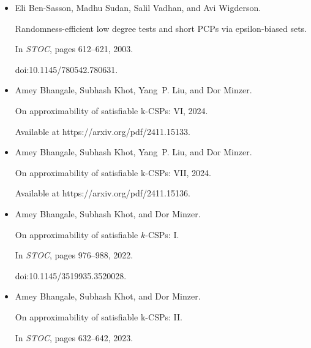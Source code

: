 \documentclass[10pt,a4paper]{article}
\begin{document}
\begin{itemize}
\emph{Random Structures Algorithms}, 32(1):49–70, 2008.


(also in APPROX-RANDOM 2004).


doi:10.1002/RSA.20182.





\item[] 
[6]

Eli Ben-Sasson, Madhu Sudan, Salil Vadhan, and Avi Wigderson.


Randomness-efficient low degree tests and short PCPs via
epsilon-biased sets.


In \emph{STOC}, pages 612–621, 2003.


doi:10.1145/780542.780631.





\item[] 
[7]

Amey Bhangale, Subhash Khot, Yang P. Liu, and Dor Minzer.


On approximability of satisfiable k-CSPs: VI, 2024.


Available at https://arxiv.org/pdf/2411.15133.





\item[] 
[8]

Amey Bhangale, Subhash Khot, Yang P. Liu, and Dor Minzer.


On approximability of satisfiable k-CSPs: VII, 2024.


Available at https://arxiv.org/pdf/2411.15136.





\item[] 
[9]

Amey Bhangale, Subhash Khot, and Dor Minzer.


On approximability of satisfiable $k$-CSPs: I.


In \emph{STOC}, pages 976–988, 2022.


doi:10.1145/3519935.3520028.





\item[] 
[10]

Amey Bhangale, Subhash Khot, and Dor Minzer.


On approximability of satisfiable k-CSPs: II.


In \emph{STOC}, pages 632–642, 2023.



\end{itemize}
\end{document}
